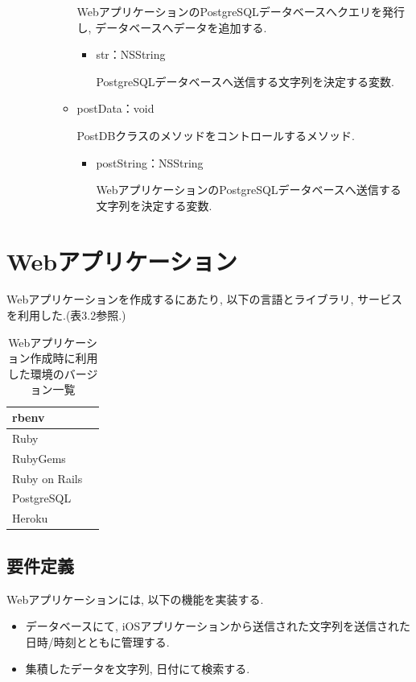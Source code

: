 \begin{description}
\begin{itemize}
\begin{itemize}
WebアプリケーションのPostgreSQLデータベースへクエリを発行し, データベースへデータを追加する.
\begin{itemize}
\item str：NSString

PostgreSQLデータベースへ送信する文字列を決定する変数.
\end{itemize}

\item postData：void

PostDBクラスのメソッドをコントロールするメソッド.
\begin{itemize}
\item postString：NSString

WebアプリケーションのPostgreSQLデータベースへ送信する文字列を決定する変数.
\end{itemize}

\end{itemize}

\end{itemize}

\end{description}

\section{Webアプリケーション}
Webアプリケーションを作成するにあたり, 以下の言語とライブラリ, サービスを利用した.(表3.2参照.)

\begin{table}
\begin{center}
\begin{tabular}{|l|l|} \hline
rbenv & \\ \hline
Ruby & \\ \hline
RubyGems & \\ \hline
Ruby on Rails & \\ \hline
PostgreSQL & \\ \hline
Heroku & \\ \hline
\end{tabular}
\end{center}
\caption{Webアプリケーション作成時に利用した環境のバージョン一覧}
\end{table}

\subsection{要件定義}
Webアプリケーションには, 以下の機能を実装する.

\begin{itemize}
\item データベースにて, iOSアプリケーションから送信された文字列を送信された日時/時刻とともに管理する.

\item 集積したデータを文字列, 日付にて検索する.
\end{itemize}

